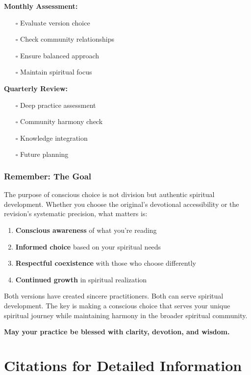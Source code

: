 \documentclass[11pt,twoside]{book}
\begin{document}
\begin{itemize}
\textbf{\textbf{Monthly Assessment:}}
\begin{itemize}
\item[{$\square$}] Evaluate version choice
\item[{$\square$}] Check community relationships
\item[{$\square$}] Ensure balanced approach
\item[{$\square$}] Maintain spiritual focus
\end{itemize}

\textbf{\textbf{Quarterly Review:}}
\begin{itemize}
\item[{$\square$}] Deep practice assessment
\item[{$\square$}] Community harmony check
\item[{$\square$}] Knowledge integration
\item[{$\square$}] Future planning
\end{itemize}
\end{itemize}
\section*{Remember: The Goal}
\label{sec:orga7b7466}

The purpose of conscious choice is not division but authentic spiritual development. Whether you choose the original's devotional accessibility or the revision's systematic precision, what matters is:

\begin{enumerate}
\item \textbf{\textbf{Conscious awareness}} of what you're reading
\item \textbf{\textbf{Informed choice}} based on your spiritual needs
\item \textbf{\textbf{Respectful coexistence}} with those who choose differently
\item \textbf{\textbf{Continued growth}} in spiritual realization
\end{enumerate}

Both versions have created sincere practitioners. Both can serve spiritual development. The key is making a conscious choice that serves your unique spiritual journey while maintaining harmony in the broader spiritual community.

\textbf{May your practice be blessed with clarity, devotion, and wisdom.}
\part*{Citations for Detailed Information}
\label{sec:org4e27c09}
\thispagestyle{plain}
\end{document}
